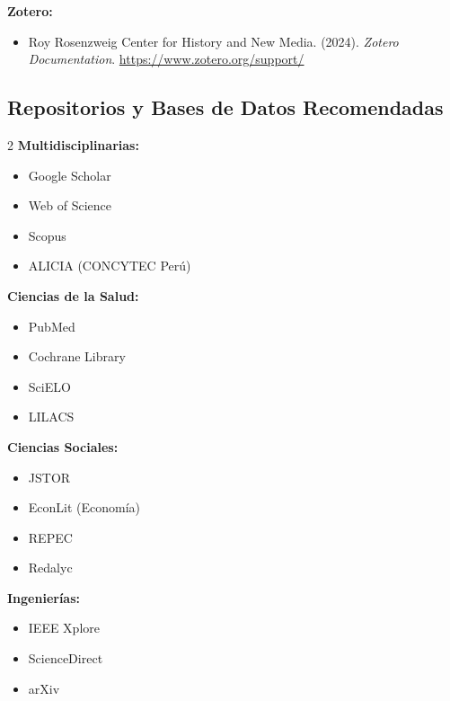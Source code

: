 \documentclass[12pt,a4paper]{yaac-luatex}
\begin{document}
	\textbf{Zotero:}
	\begin{itemize}[leftmargin=*, itemsep=0.2cm]
		\item Roy Rosenzweig Center for History and New Media. (2024). \textit{Zotero Documentation}. \url{https://www.zotero.org/support/}
	\end{itemize}
	
	\subsection*{Repositorios y Bases de Datos Recomendadas}
	
	\begin{multicols}{2}
		\textbf{Multidisciplinarias:}
		\begin{itemize}[leftmargin=*, itemsep=0.05cm]
			\item Google Scholar
			\item Web of Science
			\item Scopus
			\item ALICIA (CONCYTEC Perú)
		\end{itemize}
		
		\textbf{Ciencias de la Salud:}
		\begin{itemize}[leftmargin=*, itemsep=0.05cm]
			\item PubMed
			\item Cochrane Library
			\item SciELO
			\item LILACS
		\end{itemize}
		
		\columnbreak
		
		\textbf{Ciencias Sociales:}
		\begin{itemize}[leftmargin=*, itemsep=0.05cm]
			\item JSTOR
			\item EconLit (Economía)
			\item REPEC
			\item Redalyc
		\end{itemize}
		
		\textbf{Ingenierías:}
		\begin{itemize}[leftmargin=*, itemsep=0.05cm]
			\item IEEE Xplore
			\item ScienceDirect
			\item arXiv
		\end{itemize}
	\end{multicols}
	
	\newpage
	
\end{document}

